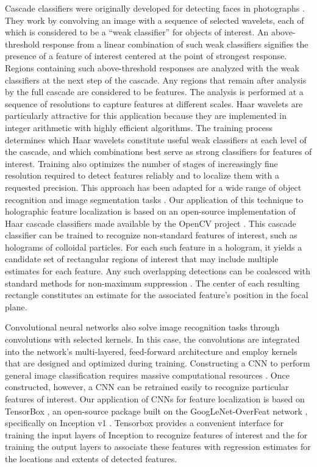 \documentclass[10pt,letterpaper]{article}
\begin{document}
Cascade classifiers were originally developed for detecting 
faces in photographs \cite{viola2001rapid}. 
They work by convolving an image with a sequence of 
selected wavelets, each of which is considered to be a
``weak classifier'' for objects of interest.
An above-threshold response from a linear combination of such
weak classifiers signifies the presence of a feature of interest
centered at the point of strongest response.
Regions containing such above-threshold responses are analyzed
with the weak classifiers at the next step of the cascade.
Any regions that remain after analysis by the full cascade are
considered to be features.
The analysis is performed at a sequence of resolutions to capture
features at different scales.
Haar wavelets are particularly attractive
for this application because they are implemented in
integer arithmetic with highly efficient algorithms.
The training process determines
which Haar wavelets constitute useful weak classifiers
at each level of the cascade, and which combinations best
serve as strong classifiers for features of interest.
Training also optimizes the number of stages of increasingly
fine resolution required to detect features reliably and to
localize them with a requested precision.
This approach has been adapted for a wide range of
object recognition and image segmentation tasks
\cite{lienhart2002extended}.
Our application of this technique to holographic feature 
localization is based on an open-source implementation
of Haar cascade classifiers made 
available by the OpenCV project \cite{itseez2015opencv}.
This cascade classifier can be trained to recognize non-standard
features of interest, such as holograms of colloidal particles.
For each such feature in a hologram, it yields
a candidate set of rectangular regions of interest that
may include multiple estimates for each feature.
Any such overlapping detections can be coalesced with
standard methods for non-maximum suppression
\cite{neubeck06}.
The center of each resulting rectangle constitutes an
estimate for the associated feature's position in the focal plane.

Convolutional neural networks also solve image recognition
tasks through convolutions with selected kernels. In this case,
the convolutions are integrated into the network's
multi-layered, feed-forward architecture 
\cite{sermanet2013overfeat} and employ kernels that are designed
and optimized during training.
Constructing a CNN to perform general image classification 
requires massive computational resources \cite{tensorflow2015-whitepaper}.
Once constructed, however, a CNN can be
retrained easily to recognize particular features of interest.
Our application of CNNs for feature localization is based on 
TensorBox \cite{stewart2015endtoend}, an open-source package 
built on the GoogLeNet-OverFeat network \cite{sermanet2013overfeat},
specifically on Inception v1 \cite{szegedy15}.
Tensorbox provides a convenient interface for training the
input layers of Inception to recognize features of interest
and the for training the output layers to associate these features
with regression estimates for the
locations and extents of detected features.
\end{document}
